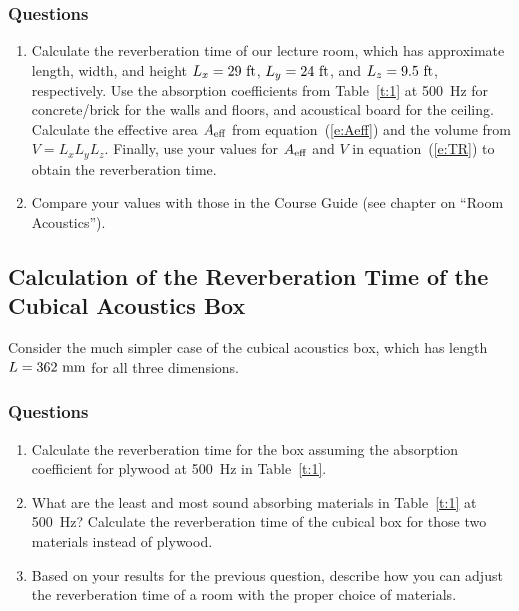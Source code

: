 \documentclass[11pt]{NSF}
\def\ben{\begin{enumerate}}
\def\een{\end{enumerate}}
\begin{document}
\subsubsection*{Questions}
\ben
\item
Calculate the reverberation time of our lecture room, which has
approximate
length, width, and height $L_x=29~{\rm ft}$, $L_y=24~{\rm ft}$, and 
$L_z=9.5~{\rm ft}$, respectively.
Use the absorption coefficients from Table~\ref{t:1} at 500~Hz
for concrete/brick for the walls and floors, and acoustical board
for the ceiling.
Calculate the effective area $A_{\rm eff}$ from
equation~(\ref{e:Aeff}) and the volume from $V = L_xL_yL_z$. 
Finally, use your values for $A_{\rm eff}$ and $V$ in
equation~(\ref{e:TR}) to
obtain the reverberation time.

\item 
Compare your values with those in the Course Guide (see chapter 
on ``Room Acoustics”).
\een

\subsection{Calculation of the Reverberation Time of the
Cubical Acoustics Box}

Consider the much simpler case of the cubical acoustics box, 
which has length $L=362~{\rm mm}$ for all three dimensions.

\subsubsection*{Questions}
\ben
\item 
Calculate the reverberation time for the box 
assuming the absorption coefficient for plywood at 500~Hz 
in Table~\ref{t:1}.

\item 
What are the least and most sound absorbing materials in 
Table~\ref{t:1} at 500~Hz?
Calculate the reverberation time of the cubical box for 
those two materials instead of plywood.

\item
Based on your results for the previous question, describe how you
can adjust the reverberation time of a room with the proper choice
of materials.

\een
\end{document}

